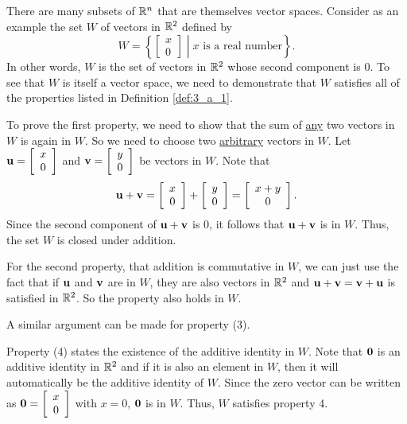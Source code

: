 \begin{example} \label{ex:3_a_1} There are many subsets of $\mathbb{R}^n$ that are themselves vector spaces. Consider as an example the set $W$ of vectors in $\mathbb{R}^2$ defined by 
\[W = \left\{ \left[ \begin{array}{c} x \\ 0 \end{array} \right] \middle| x \text{ is a real number}\right\}.\]
In other words, $W$ is the set of vectors in $\mathbb{R}^2$ whose second component is 0. To see that $W$ is itself a vector space, we need to demonstrate that $W$ satisfies all of the properties listed in Definition \ref{def:3_a_1}. 

To prove the first property, we need to show that the sum of \underline{any} two vectors in $W$ is again in $W$. So we need to choose two \underline{arbitrary} vectors in $W$. Let $\mathbf{u} = \left[ \begin{array}{c} x \\ 0 \end{array} \right]$ and $\mathbf{v} = \left[ \begin{array}{c} y \\ 0 \end{array} \right]$ be vectors in $W$. Note that 
\[\mathbf{u} + \mathbf{v} = \left[ \begin{array}{c} x \\ 0 \end{array} \right] + \left[ \begin{array}{c} y \\ 0 \end{array} \right] = \left[ \begin{array}{c} x+y \\ 0 \end{array} \right].\]
Since the second component of $\mathbf{u} + \mathbf{v}$ is 0, it follows that $\mathbf{u} + \mathbf{v}$ is in $W$. Thus, the set $W$ is closed under addition.

For the second property, that addition is commutative in $W$, we can just use the fact that if $\mathbf{u}$ and $\mathbf{v}$ are in $W$, they are also vectors in $\mathbb{R}^2$ and $\mathbf{u}+\mathbf{v}=\mathbf{v}+\mathbf{u}$ is satisfied in $\mathbb{R}^2$. So the property also holds in $W$.

A similar argument can be made for property (3). 

Property (4) states the existence of the additive identity in $W$. Note that $\mathbf{0}$ is an additive identity in $\mathbb{R}^2$ and if it is also an element in $W$, then it will automatically be the additive identity of $W$. Since the zero vector can be written as $\mathbf{0}=\left[ \begin{array}{c} x \\ 0 \end{array} \right]$ with $x=0$, $\mathbf{0}$ is in $W$. Thus, $W$ satisfies property 4.


\end{example}
